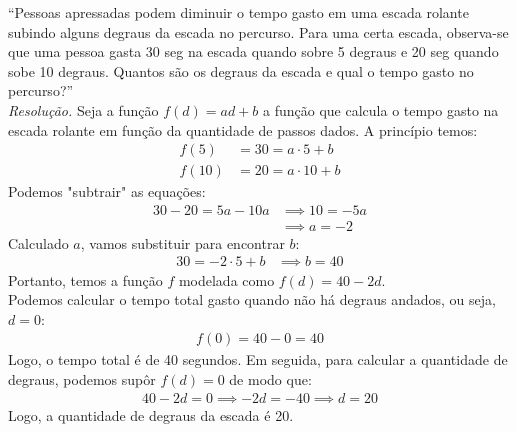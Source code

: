 \enquote{Pessoas apressadas podem diminuir o tempo gasto em uma
escada rolante subindo alguns degraus da escada no percurso.
Para uma certa escada, observa-se que uma pessoa gasta 30
seg na escada quando sobre 5 degraus e 20 seg quando sobe
10 degraus. Quantos são os degraus da escada e qual o tempo
gasto no percurso?} \\
\emph{Resolução.} Seja a função $f(d) = ad + b$ a função que calcula o tempo gasto na escada rolante em função da quantidade de passos dados.
A princípio temos:
\begin{align*}
    f(5) &= 30 = a \cdot 5 + b \\
    f(10) &= 20 = a \cdot 10 + b
\end{align*}
Podemos "subtrair" as equações:
\begin{align*}
    30 - 20 = 5a - 10a & \implies 10 = -5a \\ & \implies
    a = -2
\end{align*}
Calculado $a$, vamos substituir para encontrar $b$:
\begin{align*}
    30 = -2 \cdot 5 + b & \implies b = 40
\end{align*}
Portanto, temos a função $f$ modelada como $f(d) = 40 - 2d$. \\
Podemos calcular o tempo total gasto quando não há degraus andados, ou seja, $d = 0$:
\begin{align*}
    f(0) = 40 - 0 = 40
\end{align*}
Logo, o tempo total é de 40 segundos. Em seguida, para calcular a quantidade de degraus, podemos supôr $f(d) = 0$ de modo que:
\begin{align*}
    40 - 2d = 0 \implies -2d = -40 \implies d = 20
\end{align*}
Logo, a quantidade de degraus da escada é 20.